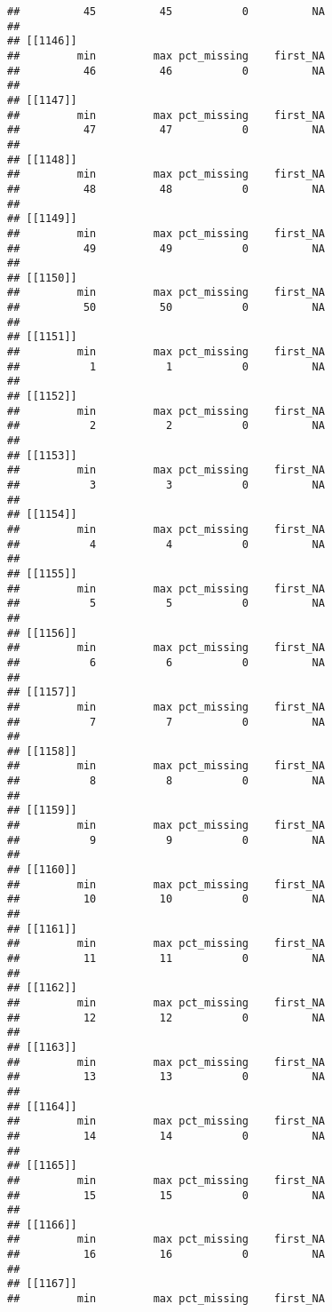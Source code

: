 \documentclass[
]{article}
\begin{document}
\begin{verbatim}
##          45          45           0          NA 
## 
## [[1146]]
##         min         max pct_missing    first_NA 
##          46          46           0          NA 
## 
## [[1147]]
##         min         max pct_missing    first_NA 
##          47          47           0          NA 
## 
## [[1148]]
##         min         max pct_missing    first_NA 
##          48          48           0          NA 
## 
## [[1149]]
##         min         max pct_missing    first_NA 
##          49          49           0          NA 
## 
## [[1150]]
##         min         max pct_missing    first_NA 
##          50          50           0          NA 
## 
## [[1151]]
##         min         max pct_missing    first_NA 
##           1           1           0          NA 
## 
## [[1152]]
##         min         max pct_missing    first_NA 
##           2           2           0          NA 
## 
## [[1153]]
##         min         max pct_missing    first_NA 
##           3           3           0          NA 
## 
## [[1154]]
##         min         max pct_missing    first_NA 
##           4           4           0          NA 
## 
## [[1155]]
##         min         max pct_missing    first_NA 
##           5           5           0          NA 
## 
## [[1156]]
##         min         max pct_missing    first_NA 
##           6           6           0          NA 
## 
## [[1157]]
##         min         max pct_missing    first_NA 
##           7           7           0          NA 
## 
## [[1158]]
##         min         max pct_missing    first_NA 
##           8           8           0          NA 
## 
## [[1159]]
##         min         max pct_missing    first_NA 
##           9           9           0          NA 
## 
## [[1160]]
##         min         max pct_missing    first_NA 
##          10          10           0          NA 
## 
## [[1161]]
##         min         max pct_missing    first_NA 
##          11          11           0          NA 
## 
## [[1162]]
##         min         max pct_missing    first_NA 
##          12          12           0          NA 
## 
## [[1163]]
##         min         max pct_missing    first_NA 
##          13          13           0          NA 
## 
## [[1164]]
##         min         max pct_missing    first_NA 
##          14          14           0          NA 
## 
## [[1165]]
##         min         max pct_missing    first_NA 
##          15          15           0          NA 
## 
## [[1166]]
##         min         max pct_missing    first_NA 
##          16          16           0          NA 
## 
## [[1167]]
##         min         max pct_missing    first_NA 

\end{verbatim}
\end{document}
